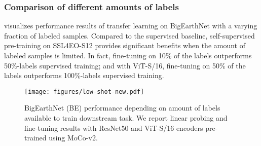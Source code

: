 \documentclass[lettersize,journal]{IEEEtran}
\begin{document}
\subsubsection{Comparison of different amounts of labels}  visualizes performance results of transfer learning on BigEarthNet with a varying fraction of labeled samples. Compared to the supervised baseline, self-supervised pre-training on SSL4EO-S12 provides significant benefits when the amount of labeled samples is limited. In fact, fine-tuning on 10\% of the labels outperforms 50\%-labels supervised training; and with ViT-S/16, fine-tuning on 50\% of the labels outperforms 100\%-labels supervised training.
\vspace{-0.5em}
\begin{figure*}[]
\centering
\begin{minipage}[c]{.53\linewidth}
 \texttt{[image: figures/low-shot-new.pdf]}
\end{minipage}
\caption{BigEarthNet (BE) performance depending on amount of labels available to train downstream task. We report linear probing and fine-tuning results with ResNet50 and ViT-S/16 encoders pre-trained using MoCo-v2.}
\label{fig:lowshot}
\vspace{-1em}
\end{figure*}
\end{document}
